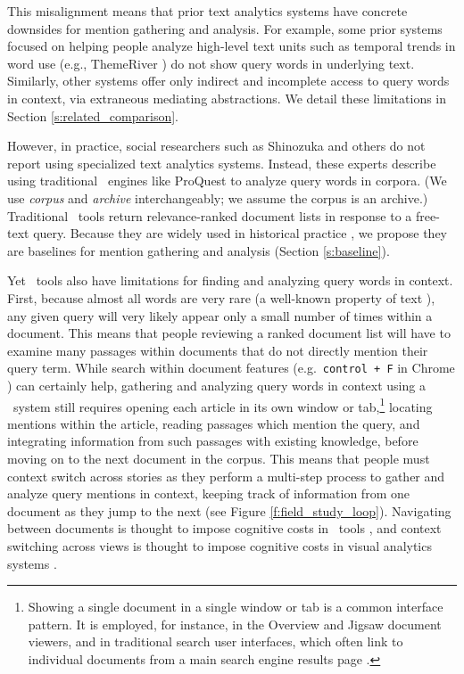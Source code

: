 This misalignment means that prior text analytics systems have concrete downsides for mention gathering and analysis. For example, some prior systems focused on helping people analyze high-level text units such as temporal trends in word use (e.g., ThemeRiver \cite{ThemeRiver}) do not show query words in underlying text. Similarly, other systems offer only indirect and incomplete access to query words in context, via extraneous mediating abstractions. We detail these limitations in Section \ref{s:related_comparison}.




However, in practice, social researchers such as Shinozuka \cite{japanesebeetles} and others \cite{Putnam, FrancesMaule, Loving, watermelon, katrinarefugee, racesuicide} do not report using specialized text analytics systems.
Instead, these experts describe using traditional {\Baselongname~engines} like ProQuest \cite{proquest} to analyze query words in corpora. 
(We use \textit{corpus} and \textit{archive} interchangeably; we assume the corpus is an archive.)
Traditional \Baselongname~tools return relevance-ranked document lists in response to a free-text query.
Because they are widely used in historical practice \cite{allen, Putnam, Chassanoff, FrancesMaule},
we propose they are baselines for mention gathering and analysis (Section \ref{s:baseline}). 

Yet \Baselongname~tools also have limitations for finding and analyzing query words in context.
First, because almost all words are very rare (a well-known property of text \cite{Zipf49}), any given query will very likely appear only a small number of times within a document.
This means that people reviewing a ranked document list will have to examine many passages within documents that do not directly mention their query term.
While search within document features (e.g.\ \texttt{control + F} in Chrome \cite{chromeF}) can certainly help, gathering and analyzing query words in context using a \Baselongname~system still requires opening each article in its own window or tab,\footnote{Showing a single document in a single window or tab is a common interface pattern. It is employed, for instance, in the Overview \cite{overview} and Jigsaw \cite{ubigsaw} document viewers, and in traditional search user interfaces, which often link to individual documents from a main search engine results page \cite[Section 6.3]{croft2010search}.} locating mentions within the article, reading passages which mention the query, and integrating information from such passages with existing knowledge, before moving on to the next document in the corpus.
This means that people must context switch across stories as they perform a multi-step process to gather and analyze query mentions in context, keeping track of information from one document as they jump to the next (see Figure \ref{f:field_study_loop}).
Navigating between documents is thought to impose cognitive costs in \Baselongname~tools \cite{orientationWhite,fluidLinks}, and context switching across views is thought to impose cognitive costs in visual analytics systems \cite{Baldonado}.

